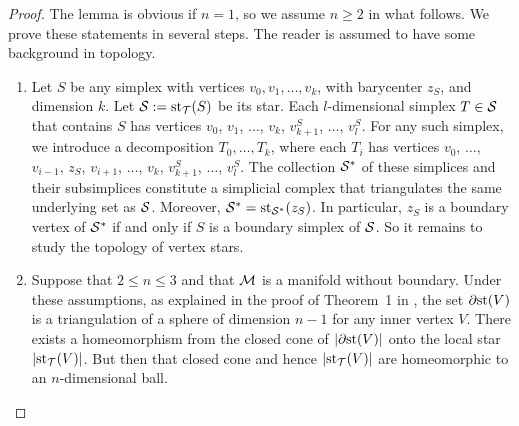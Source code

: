\documentclass[10pt,a4paper]{article}
\begin{document}
\begin{proof}
    The lemma is obvious if $n = 1$, so we assume $n \geq 2$ in what follows. 
    We prove these statements in several steps. 
    The reader is assumed to have some background in topology. 
    \begin{enumerate}
    \item 
    Let $S$ be any simplex with vertices $v_0, v_1, \dots, v_k$, with barycenter $z_{S}$, and dimension $k$.
    Let ${\mathcal S} := \operatorname{st}_{{\mathcal T}}(S)$ be its star. 
    Each $l$-dimensional simplex $T \in {\mathcal S}$ that contains $S$ 
    has vertices $v_0$, $v_1$, $\dots$, $v_k$, $v_{k+1}^{S}$, $\dots$, $v_{l}^{S}$. 
    For any such simplex, we introduce a decomposition $T_{0}, \dots, T_{k}$, where each $T_{i}$ has vertices 
    $v_0$, $\dots$, $v_{i-1}$, $z_{S}$, $v_{i+1}$, $\dots$, $v_k$, $v_{k+1}^{S}$, $\dots$, $v_{l}^{S}$.
    The collection ${\mathcal S}^\ast$ of these simplices and their subsimplices constitute a simplicial complex 
    that triangulates the same underlying set as ${\mathcal S}$.
    Moreover, ${\mathcal S}^\ast = \operatorname{st}_{{\mathcal S}^\ast}(z_{S})$. 
    In particular, $z_{S}$ is a boundary vertex of ${\mathcal S}^\ast$ if and only if $S$ is a boundary simplex of ${\mathcal S}$. 
    So it remains to study the topology of vertex stars. 
    
    \item 
    Suppose that $2 \leq n \leq 3$ and that ${\mathcal M}$ is a manifold without boundary. 
    Under these assumptions, 
    as explained in the proof of Theorem~1 in \cite{Siebenmann1979},
    the set ${\partial \rm st}(V)$ is a triangulation of a sphere of dimension $n-1$ for any inner vertex $V$. 
    There exists a homeomorphism from the closed cone of $\left| {\partial \rm st}(V) \right|$ onto the local star $\left| \operatorname{st}_{{\mathcal T}}(V) \right|$.
    But then that closed cone and hence $\left| \operatorname{st}_{{\mathcal T}}(V) \right|$ are homeomorphic to an $n$-dimensional ball. 
    

\end{enumerate}
\end{proof}
\end{document}
